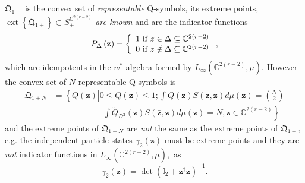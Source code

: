 \documentclass[aps,preprint]{revtex4}%
\begin{document}
$\mathfrak{Q}_{1+}$ is the convex set of \emph{representable} Q-symbols, its
extreme points, $\operatorname*{ext}\left\{  \mathfrak{Q}_{1+}\right\}
\subset S_{+}^{\mathbb{C}^{2\left(  r-2\right)  }}$ \emph{are known }and are
the indicator functions%
\begin{equation}
P_{\Delta}\left(  \mathbf{z}\right)  =\left\{
\begin{array}
[c]{c}%
1\text{ if }z\in\Delta\subseteq\mathbb{C}^{2\left(  r-2\right)  }\\
0\text{ if }z\notin\Delta\subseteq\mathbb{C}^{2\left(  r-2\right)  }%
\end{array}
\right.  ,
\end{equation}
which are idempotents in the $w^{\ast}$-algebra formed by $L_{\infty}\left(
\mathbb{C}^{2\left(  r-2\right)  },\mu\right)  .$ However the convex set of
$N$ representable Q-symbols is
\begin{align}
\mathfrak{Q}_{1+N}  &  =\left\{  Q\left(  \mathbf{z}\right)  \left\vert 0\leq
Q\left(  \mathbf{z}\right)  \leq1;\int Q\left(  \mathbf{z}\right)  S\left(
\mathbf{\bar{z},z}\right)  d\mu\left(  \mathbf{z}\right)  =\binom{N}%
{2}\right.  \right. \nonumber\\
&  \qquad\qquad\qquad\left.  \int\breve{Q}_{D^{2}}\left(  \mathbf{z}\right)
S\left(  \mathbf{\bar{z},z}\right)  d\mu\left(  \mathbf{z}\right)
=N,\mathbf{z\in}\mathbb{C}^{2\left(  r-2\right)  }\right\}
\end{align}
and the extreme points of $\mathfrak{Q}_{1+N}$ are \emph{not} the same as the
extreme points of $\mathfrak{Q}_{1+},$ e.g. the independent particle states
$\gamma_{2}\left(  \mathbf{z}\right)  $ must be extreme points and they are
\emph{not} indicator functions in $L_{\infty}\left(  \mathbb{C}^{2\left(
r-2\right)  },\mu\right)  ,$ as
\begin{equation}
\gamma_{2}\left(  \mathbf{z}\right)  =\det\left(  \mathbb{I}_{2}%
+\mathbf{z}^{\dagger}\mathbf{z}\right)  ^{-1}.
\end{equation}
\end{document}
